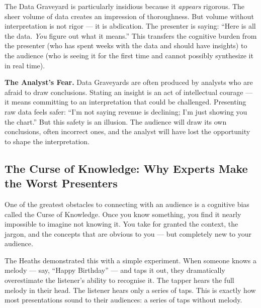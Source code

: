 The Data Graveyard is particularly insidious because it \emph{appears} rigorous. The sheer volume of data creates an impression of thoroughness. But volume without interpretation is not rigor --- it is abdication. The presenter is saying: ``Here is all the data. \emph{You} figure out what it means.'' This transfers the cognitive burden from the presenter (who has spent weeks with the data and should have insights) to the audience (who is seeing it for the first time and cannot possibly synthesize it in real time).

\begin{diagnosisbox}
\textbf{The Analyst's Fear.} Data Graveyards are often produced by analysts who are afraid to draw conclusions. Stating an insight is an act of intellectual courage --- it means committing to an interpretation that could be challenged. Presenting raw data feels safer: ``I'm not saying revenue is declining; I'm just showing you the chart.'' But this safety is an illusion. The audience will draw its own conclusions, often incorrect ones, and the analyst will have lost the opportunity to shape the interpretation.
\end{diagnosisbox}

\subsection{The Curse of Knowledge: Why Experts Make the Worst Presenters}


One of the greatest obstacles to connecting with an audience is a cognitive bias called the Curse of Knowledge. Once you know something, you find it nearly impossible to imagine not knowing it. You take for granted the context, the jargon, and the concepts that are obvious to you --- but completely new to your audience.

The Heaths demonstrated this with a simple experiment. When someone knows a melody --- say, ``Happy Birthday'' --- and taps it out, they dramatically overestimate the listener's ability to recognise it. The tapper hears the full melody in their head. The listener hears only a series of taps. This is exactly how most presentations sound to their audiences: a series of taps without melody.

